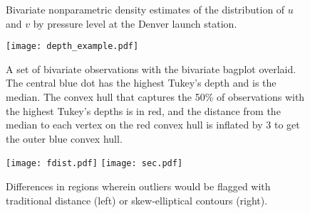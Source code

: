 \documentclass[12pt]{article}
\begin{document}
\graphicspath{{Code/Figures/}}
 \begin{figure}
\begin{center}
\centering{}
\centering{}\vspace{0 cm}
\centering{}\vspace{0 cm}
\centering{}\vspace{0 cm}
\centering{}\vspace{0 cm}
\centering{}\vspace{0 cm}
\centering{}\vspace{0 cm}
\centering{}\vspace{0 cm}

\caption{Bivariate nonparametric density estimates of the distribution of $u$ and $v$ by pressure level at the Denver launch station.}\label{fig:bivariate}
\end{center}
\end{figure}



 \begin{figure}
\begin{center}
\texttt{[image: depth\_example.pdf]}
\caption{A set of bivariate observations with the bivariate bagplot overlaid.  The central blue dot has the highest Tukey's depth and is the median.  The convex hull that captures the 50\% of observations with the highest Tukey's depths is in red, and the distance from the median to each vertex on the red convex hull is inflated by 3 to get the outer blue convex hull.  }\label{fig:bagplot}

\end{center}
\end{figure}



\begin{figure}[h!]
	\begin{center}
		\texttt{[image: fdist.pdf]}
		\texttt{[image: sec.pdf]}
		\caption{Differences in regions wherein outliers would be flagged with traditional distance (left) or  skew-elliptical contours (right).  }\label{fig:dist_sec}
	\end{center}
\end{figure}
\end{document}
